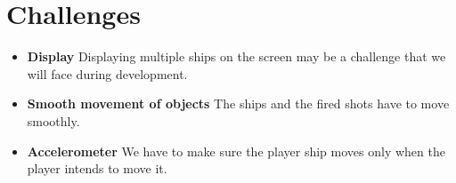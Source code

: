 \documentclass[12pt]{style}
\begin{document}
    \section{Challenges}
    \sectionsepnew
    \noindent\begin{itemize}[before=\sffamily,topsep=0pt]
        \setlength\itemsep{-2pt}
        \item \textbf{Display} Displaying multiple ships on the screen may be a challenge that we will face during development.
        \item \textbf{Smooth movement of objects} The ships and the fired shots have to move smoothly.
        \item \textbf{Accelerometer} We have to make sure the player ship moves only when the player intends to move it.
    \end{itemize}
\end{document}
